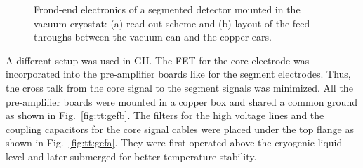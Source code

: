 \begin{figure}[tbhp]
\centering
{}\hfil%
%
\caption{Frond-end electronics of a segmented detector mounted in the
vacuum cryostat: (a) read-out scheme and (b) layout of the
feed-throughs between the vacuum can and the copper ears.}
\label{fig:tt:sif}
\end{figure}

A different setup was used in GII. The FET for the core electrode was
incorporated into the pre-amplifier boards like for the segment
electrodes. Thus, the cross talk from the core signal to the segment
signals was minimized. All the pre-amplifier boards were mounted in a
copper box and shared a common ground as shown in
Fig.~\ref{fig:tt:gefb}. The filters for the high voltage lines and the
coupling capacitors for the core signal cables were placed under the
top flange as shown in Fig.~\ref{fig:tt:gefa}. They were first
operated above the cryogenic liquid level and later submerged for
better temperature stability.

